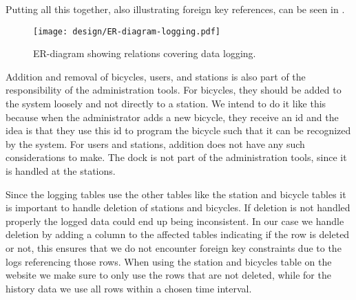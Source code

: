 Putting all this together, also illustrating foreign key references, can be seen in .

\begin{figure}
\texttt{[image: design/ER-diagram-logging.pdf]}
\vspace*{-2cm}
\caption{ER-diagram showing relations covering data logging.}\label{fig:er-dia-log}
\end{figure}

Addition and removal of bicycles, users, and stations is also part of the responsibility of the administration tools. 
For bicycles, they should be added to the system loosely and not directly to a station.
We intend to do it like this because when the administrator adds a new bicycle, they receive an id and the idea is that they use this id to program the bicycle such that it can be recognized by the system.
For users and stations, addition does not have any such considerations to make. 
The dock is not part of the administration tools, since it is handled at the stations.

Since the logging tables use the other tables like the station and bicycle tables it is important to handle deletion of stations and bicycles. 
If deletion is not handled properly the logged data could end up being inconsistent. 
In our case we handle deletion by adding a column to the affected tables indicating if the row is deleted or not, this ensures that we do not encounter foreign key constraints due to the logs referencing those rows. 
When using the station and bicycles table on the website we make sure to only use the rows that are not deleted, while for the history data we use all rows within a chosen time interval.
